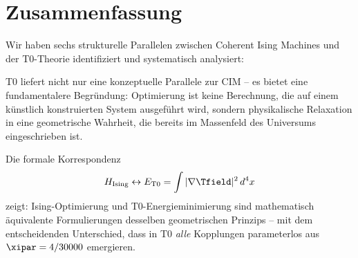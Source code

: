 \clearpage

\section{Zusammenfassung}
\label{sec:summary}

Wir haben sechs strukturelle Parallelen zwischen Coherent Ising Machines und der 
T0-Theorie identifiziert und systematisch analysiert:

\begin{table}[h]
    \centering
    \caption{Zusammenfassung: Sechs Parallelen T0 $\leftrightarrow$ CIM}
    \label{tab:summary}
\end{table}

T0 liefert nicht nur eine konzeptuelle Parallele zur CIM -- es bietet eine 
fundamentalere Begründung: Optimierung ist keine Berechnung, die auf einem 
künstlich konstruierten System ausgeführt wird, sondern physikalische Relaxation 
in eine geometrische Wahrheit, die bereits im Massenfeld des Universums 
eingeschrieben ist.

\begin{keyresult}
    Die formale Korrespondenz
    \begin{equation}
        H_{\text{Ising}} \leftrightarrow E_{\text{T0}} = \int |\nabla \Tfield|^2 \, d^4x
    \end{equation}
    zeigt: Ising-Optimierung und T0-Energieminimierung sind mathematisch äquivalente 
    Formulierungen desselben geometrischen Prinzips -- mit dem entscheidenden Unterschied, 
    dass in T0 \emph{alle} Kopplungen parameterlos aus $\xipar = 4/30000$ emergieren.
\end{keyresult}

